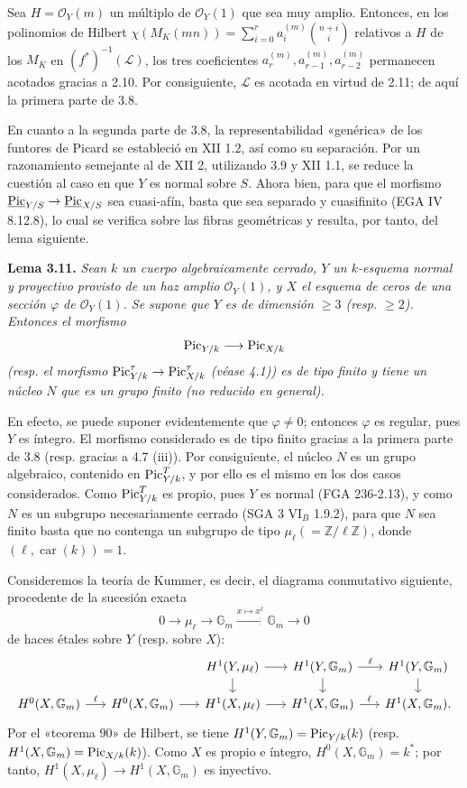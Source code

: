 Sea $H=\mathcal O_Y(m)$ un múltiplo de $\mathcal O_Y(1)$ que sea muy amplio.
Entonces, en los polinomios de Hilbert
$\chi(M_K(mn))=\sum_{i=0}^{r}a_i^{(m)}\binom{n+i}{i}$ relativos a $H$ de los
$M_K$ en $(f^*)^{-1}(\mathcal L)$, los tres coeficientes
$a_r^{(m)},a_{r-1}^{(m)},a_{r-2}^{(m)}$ permanecen acotados gracias a 2.10.
Por consiguiente, $\mathcal L$ es acotada en virtud de 2.11; de aquí la
primera parte de 3.8.

En cuanto a la segunda parte de 3.8, la representabilidad «genérica» de los
funtores de Picard se estableció en XII 1.2, así como su separación. Por un
razonamiento semejante al de XII 2, utilizando 3.9 y XII 1.1, se reduce la
cuestión al caso en que $Y$ es normal sobre $S$. Ahora bien, para que el
morfismo
$\underline{\operatorname{Pic}}_{Y/S}\to\underline{\operatorname{Pic}}_{X/S}$ sea cuasi-afín, basta
que sea separado y cuasifinito (EGA IV 8.12.8), lo cual se verifica sobre
las fibras geométricas y resulta, por tanto, del lema siguiente.

\textbf{Lema 3.11.} \emph{Sean $k$ un cuerpo algebraicamente cerrado, $Y$ un
$k$-esquema normal y proyectivo provisto de un haz amplio $\mathcal O_Y(1)$,
y $X$ el esquema de ceros de una sección $\varphi$ de $\mathcal O_Y(1)$. Se
supone que $Y$ es de dimensión $\geq3$ (resp. $\geq2$). Entonces el
morfismo}
\[
\operatorname{Pic}_{Y/k}\longrightarrow\operatorname{Pic}_{X/k}
\]
\emph{(resp. el morfismo $\operatorname{Pic}^\tau_{Y/k}\to\operatorname{Pic}^\tau_{X/k}$ (véase 4.1)) es de
tipo finito y tiene un núcleo $N$ que es un grupo finito (no reducido en
general).}

En efecto, se puede suponer evidentemente que $\varphi\ne0$; entonces
$\varphi$ es regular, pues $Y$ es íntegro. El morfismo considerado es de
tipo finito gracias a la primera parte de 3.8 (resp. gracias a 4.7 (iii)).
Por consiguiente, el núcleo $N$ es un grupo algebraico, contenido en
$\operatorname{Pic}^T_{Y/k}$, y por ello es el mismo en los dos casos considerados. Como
$\operatorname{Pic}^T_{Y/k}$ es propio, pues $Y$ es normal (FGA 236-2.13), y como $N$ es
un subgrupo necesariamente cerrado (SGA 3 VI$_B$ 1.9.2), para que $N$ sea
finito basta que no contenga un subgrupo de tipo
$\mu_\ell(=\mathbb Z/\ell\mathbb Z)$, donde
$(\ell,\operatorname{car}(k))=1$.

Consideremos la teoría de Kummer, es decir, el diagrama conmutativo siguiente,
procedente de la sucesión exacta
\[
0\longrightarrow\mu_\ell\longrightarrow\mathbb G_m
\xrightarrow{x\mapsto x^\ell}\mathbb G_m\longrightarrow0
\]
de haces étales sobre $Y$ (resp. sobre $X$):
\[
\begin{tikzcd}[column sep=1.6em,row sep=1.2em]
& & H^1(Y,\mu_\ell)\arrow[r]\arrow[d]&
H^1(Y,\mathbb G_m)\arrow[r,"\ell"]\arrow[d]&
H^1(Y,\mathbb G_m)\arrow[d]\\
H^0(X,\mathbb G_m)\arrow[r,"\ell"]&H^0(X,\mathbb G_m)\arrow[r]&
H^1(X,\mu_\ell)\arrow[r]&H^1(X,\mathbb G_m)\arrow[r,"\ell"]&
H^1(X,\mathbb G_m).
\end{tikzcd}
\]
Por el «teorema 90» de Hilbert, se tiene
$H^1(Y,\mathbb G_m)=\operatorname{Pic}_{Y/k}(k)$ (resp.
$H^1(X,\mathbb G_m)=\operatorname{Pic}_{X/k}(k)$). Como $X$ es propio e íntegro,
$H^0(X,\mathbb G_m)=k^*$; por tanto,
$H^1(X,\mu_\ell)\to H^1(X,\mathbb G_m)$ es inyectivo.

